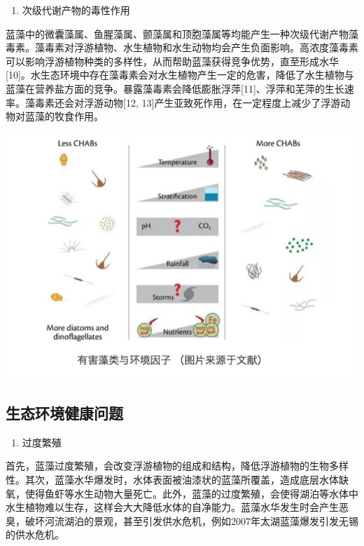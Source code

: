 \documentclass[]{book}
\providecommand{\tightlist}{%
  \setlength{\itemsep}{0pt}\setlength{\parskip}{0pt}}
\begin{document}
\begin{enumerate}
\def\labelenumi{\arabic{enumi}.}
\setcounter{enumi}{4}
\tightlist
\item
  次级代谢产物的毒性作用
\end{enumerate}

蓝藻中的微囊藻属、鱼腥藻属、颤藻属和顶胞藻属等均能产生一种次级代谢产物藻毒素。藻毒素对浮游植物、水生植物和水生动物均会产生负面影响。高浓度藻毒素可以影响浮游植物种类的多样性，从而帮助蓝藻获得竞争优势，直至形成水华{[}10{]}。水生态环境中存在藻毒素会对水生植物产生一定的危害，降低了水生植物与蓝藻在营养盐方面的竞争。暴露藻毒素会降低膨胀浮萍{[}11{]}、浮萍和芜萍的生长速率。藻毒素还会对浮游动物{[}12, 13{]}产生亚致死作用，在一定程度上减少了浮游动物对蓝藻的牧食作用。

\includegraphics[width=8.33in]{images/lanzao2}

\hypertarget{ux751fux6001ux73afux5883ux5065ux5eb7ux95eeux9898}{%
\subsection{生态环境健康问题}\label{ux751fux6001ux73afux5883ux5065ux5eb7ux95eeux9898}}

\begin{enumerate}
\def\labelenumi{\arabic{enumi}.}
\tightlist
\item
  过度繁殖
\end{enumerate}

首先，蓝藻过度繁殖，会改变浮游植物的组成和结构，降低浮游植物的生物多样性。其次，蓝藻水华爆发时，水体表面被油漆状的蓝藻所覆盖，造成底层水体缺氧，使得鱼虾等水生动物大量死亡。此外，蓝藻的过度繁殖，会使得湖泊等水体中水生植物难以生存，这样会大大降低水体的自净能力。蓝藻水华发生时会产生恶臭，破坏河流湖泊的景观，甚至引发供水危机，例如2007年太湖蓝藻爆发引发无锡的供水危机。
\end{document}
